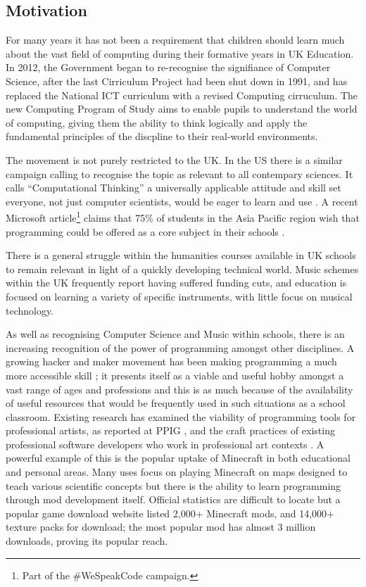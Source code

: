 \documentclass[11pt, abstracton, twoside, titlepage=true]{scrartcl}
\begin{document}
\subsection{Motivation}
For many years it has not been a requirement that children should learn much
about the vast field of computing during their formative years in UK 
Education. In 2012, the Government began to re-recognise the signifiance of 
Computer Science, after the last Cirriculum Project had been shut down in 1991, 
and has replaced the National ICT curriculum with a revised 
Computing cirruculum. The new Computing Program of Study \cite{DfE13} aims to 
enable pupils to understand the world of computing, giving them the ability to 
think logically and apply the fundamental principles of the discpline to their 
real-world environments.

The movement is not purely restricted to the UK. In the US there is a similar 
campaign calling to recognise the topic as relevant to all contempary 
sciences. It calls ``Computational Thinking'' a universally applicable 
attitude and skill set everyone, not just computer scientists, would be eager 
to learn and use \cite{Wing06}. A recent Microsoft article\footnote{Part of the 
\#WeSpeakCode campaign.} claims that 75\% of students in the Asia Pacific region
wish that programming could be offered as a core subject in their schools \cite{micro}.

There is a general struggle within the humanities courses available in UK schools 
to remain relevant in light of a quickly developing technical world. Music schemes 
within the UK frequently report having suffered funding cuts, and education is 
focused on learning a variety of specific instruments, with little focus on 
musical technology.

As well as recognising Computer Science and Music within schools, there 
is an increasing recognition of the power of programming amongst other disciplines. 
A growing hacker and maker movement has been making programming a 
much more accessible skill \cite{BAD14}; it presents itself as a viable and 
useful hobby amongst a vast range of ages and professions and this is as much 
because of the availability of useful resources that would be frequently used 
in such situations as a school classroom. Existing research has examined the 
viability of programming tools for professional artists, as reported at PPIG 
\cite{Ch12,BC05}, and the craft practices of existing professional software
developers who work in professional art contexts \cite{W10}. A powerful example 
of this is the popular uptake of Minecraft in both educational and personal areas. 
Many uses focus on playing Minecraft on maps designed to teach various scientific 
concepts\cite{mine1,mine2} but there is the ability to learn programming through 
mod development itself. Official statistics are difficult to locate but a popular 
game download website listed 2,000+ Minecraft mods, and 14,000+ texture packs for 
download; the most popular mod has almost 3 million downloads\cite{crush}, proving 
its popular reach. 
\end{document}
